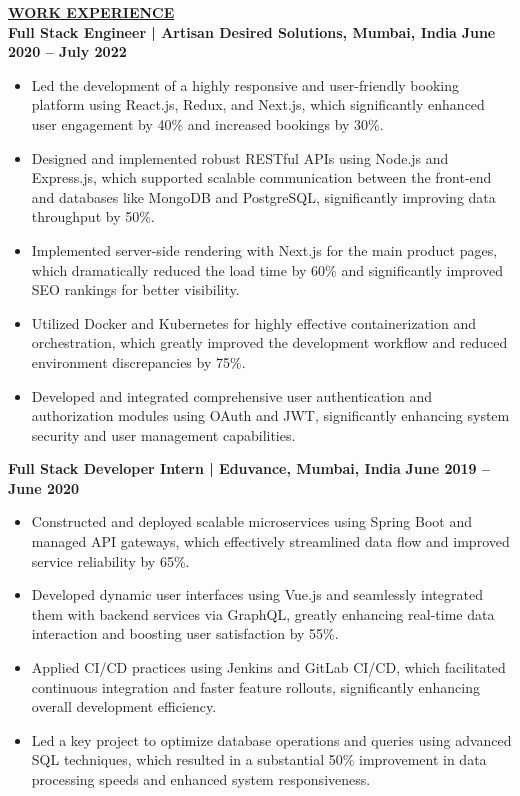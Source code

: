 \documentclass{article}
\begin{document}
\noindent \textbf{\underline{WORK EXPERIENCE}} \\
\noindent \textbf{Full Stack Engineer | Artisan Desired Solutions, Mumbai, India}  \hfill \textbf{June 2020 – July 2022}
\begin{itemize}[noitemsep,nolistsep,leftmargin=*]
\item {\small Led the development of a highly responsive and user-friendly booking platform using React.js, Redux, and Next.js, which significantly enhanced user engagement by 40\% and increased bookings by 30\%.}
\item {\small Designed and implemented robust RESTful APIs using Node.js and Express.js, which supported scalable communication between the front-end and databases like MongoDB and PostgreSQL, significantly improving data throughput by 50\%.}
\item {\small Implemented server-side rendering with Next.js for the main product pages, which dramatically reduced the load time by 60\% and significantly improved SEO rankings for better visibility.}
\item {\small Utilized Docker and Kubernetes for highly effective containerization and orchestration, which greatly improved the development workflow and reduced environment discrepancies by 75\%.}
\item {\small Developed and integrated comprehensive user authentication and authorization modules using OAuth and JWT, significantly enhancing system security and user management capabilities.}
\end{itemize}
\vspace{1mm}

\noindent \textbf{Full Stack Developer Intern | Eduvance, Mumbai, India}  \hfill \textbf{June 2019 – June 2020}
\begin{itemize}[noitemsep,nolistsep,leftmargin=*]
\item {\small Constructed and deployed scalable microservices using Spring Boot and managed API gateways, which effectively streamlined data flow and improved service reliability by 65\%.}
\item {\small Developed dynamic user interfaces using Vue.js and seamlessly integrated them with backend services via GraphQL, greatly enhancing real-time data interaction and boosting user satisfaction by 55\%.}
\item {\small Applied CI/CD practices using Jenkins and GitLab CI/CD, which facilitated continuous integration and faster feature rollouts, significantly enhancing overall development efficiency.}
\item {\small Led a key project to optimize database operations and queries using advanced SQL techniques, which resulted in a substantial 50\% improvement in data processing speeds and enhanced system responsiveness.}
\end{itemize}
\end{document}
